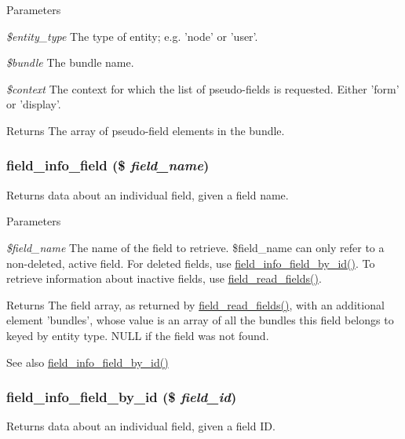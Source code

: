 \begin{DoxyParams}{Parameters}
\item[{\em \$entity\_\-type}]The type of entity; e.g. 'node' or 'user'. \item[{\em \$bundle}]The bundle name. \item[{\em \$context}]The context for which the list of pseudo-\/fields is requested. Either 'form' or 'display'.\end{DoxyParams}
\begin{DoxyReturn}{Returns}
The array of pseudo-\/field elements in the bundle. 
\end{DoxyReturn}
\hypertarget{group__field__info_ga74cfc942cd2baa5c49780b08c5d357d4}{
\subsubsection[{field\_\-info\_\-field}]{\setlength{\rightskip}{0pt plus 5cm}field\_\-info\_\-field (\$ {\em field\_\-name})}}
\label{group__field__info_ga74cfc942cd2baa5c49780b08c5d357d4}
Returns data about an individual field, given a field name.


\begin{DoxyParams}{Parameters}
\item[{\em \$field\_\-name}]The name of the field to retrieve. \$field\_\-name can only refer to a non-\/deleted, active field. For deleted fields, use \hyperlink{group__field__info_ga901d91feefc6639d0ad97289ae472523}{field\_\-info\_\-field\_\-by\_\-id()}. To retrieve information about inactive fields, use \hyperlink{group__field__crud_ga0dae5c311ea301668c8906d2711fb3c5}{field\_\-read\_\-fields()}.\end{DoxyParams}
\begin{DoxyReturn}{Returns}
The field array, as returned by \hyperlink{group__field__crud_ga0dae5c311ea301668c8906d2711fb3c5}{field\_\-read\_\-fields()}, with an additional element 'bundles', whose value is an array of all the bundles this field belongs to keyed by entity type. NULL if the field was not found.
\end{DoxyReturn}
\begin{DoxySeeAlso}{See also}
\hyperlink{group__field__info_ga901d91feefc6639d0ad97289ae472523}{field\_\-info\_\-field\_\-by\_\-id()} 
\end{DoxySeeAlso}
\hypertarget{group__field__info_ga901d91feefc6639d0ad97289ae472523}{
\subsubsection[{field\_\-info\_\-field\_\-by\_\-id}]{\setlength{\rightskip}{0pt plus 5cm}field\_\-info\_\-field\_\-by\_\-id (\$ {\em field\_\-id})}}
\label{group__field__info_ga901d91feefc6639d0ad97289ae472523}
Returns data about an individual field, given a field ID.


